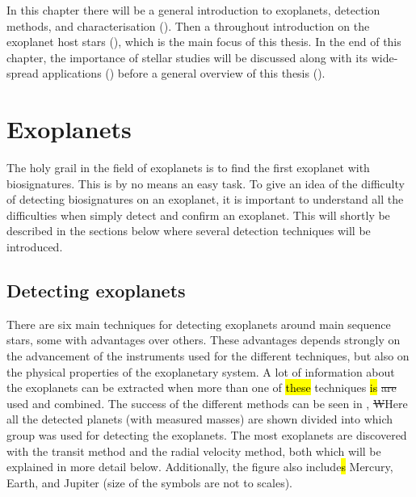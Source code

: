 In this chapter there will be a general introduction to exoplanets, detection methods, and
characterisation (). Then a throughout introduction on the exoplanet host stars
(), which is the main focus of this thesis. In the end of this chapter,
the importance of stellar studies will be discussed along with its wide-spread applications
() before a general overview of this thesis ().



\section{Exoplanets}
\label{sec:exoplanets}

The holy grail in the field of exoplanets is to find the first exoplanet with biosignatures. This is
by no means an easy task. To give an idea of the difficulty of detecting biosignatures on an
exoplanet, it is important to understand all the difficulties when simply detect and confirm an
exoplanet. This will shortly be described in the sections below where several detection techniques
will be introduced.

\subsection{Detecting exoplanets}
\label{sec:detecting_exoplanets}

There are six main techniques for detecting exoplanets around main sequence stars, some with
advantages over others. These advantages depends strongly on the advancement of the instruments used
for the different techniques, but also on the physical properties of the exoplanetary system. A lot
of information about the exoplanets can be extracted when more than one of \hl{these} techniques
\hl{is} \st{are} used and combined. The success of the different methods can be seen in
, \st{W}Here all the detected planets (with measured masses) are shown
divided into which group was used for detecting the exoplanets. The most exoplanets are discovered
with the transit method and the radial velocity method, both which will be explained in more detail
below. Additionally, the figure also include\hl{s} Mercury, Earth, and Jupiter (size of the symbols
are not to scales).

